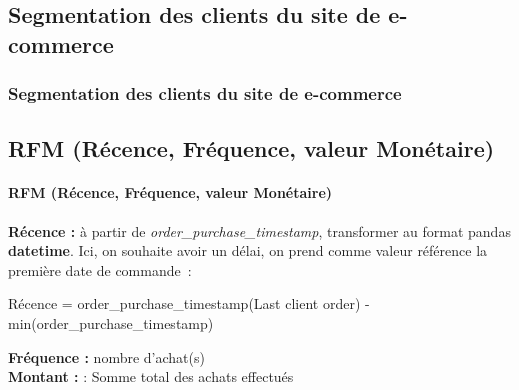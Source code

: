 \documentclass{beamer}
\begin{document}


\begin{frame}
\section{Segmentation des clients du site de e-commerce}
\frametitle{Segmentation des clients du site de e-commerce}
    \subsection{RFM (Récence, Fréquence, valeur Monétaire) }
    \framesubtitle{RFM (Récence, Fréquence, valeur Monétaire)}
    
    \textbf{Récence : }  à partir de \textit{order\_purchase\_timestamp}, transformer au format pandas \textbf{datetime}. Ici, on souhaite avoir un délai, on prend comme valeur référence la première date de commande : \\
    
    \begin{center}
        Récence = order\_purchase\_timestamp(Last client order) - min(order\_purchase\_timestamp)
    \end{center}

    \textbf{Fréquence : }  nombre d'achat(s)\\
    \textbf{Montant : } : Somme total des achats effectués \\


     
\end{frame}

\end{document}
